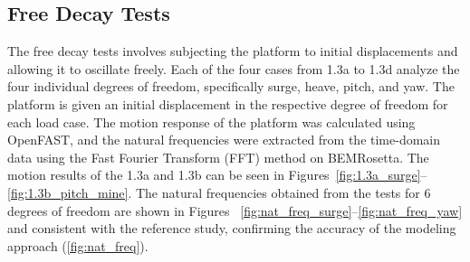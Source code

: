 \documentclass[a4paper, 11pt]{article}
\begin{document}
\subsection{Free Decay Tests}
\hspace*{0.5cm}The free decay tests involves subjecting the platform to initial displacements and allowing it to oscillate freely. Each of the four cases from 1.3a to 1.3d analyze the four individual degrees of freedom, specifically surge, heave, pitch, and yaw. The platform is given an initial displacement in the respective degree of freedom for each load case. The motion response of the platform was calculated using OpenFAST, and the natural frequencies were extracted from the time-domain data using the Fast Fourier Transform (FFT) method on BEMRosetta. The motion results of the 1.3a and 1.3b can be seen in Figures~\ref{fig:1.3a_surge}--\ref{fig:1.3b_pitch_mine}. The natural frequencies obtained from the tests for 6 degrees of freedom are shown in Figures ~\ref{fig:nat_freq_surge}--\ref{fig:nat_freq_yaw} and consistent with the reference study, confirming the accuracy of the modeling approach (\autoref{fig:nat_freq}).
\vspace{0.3cm}
\end{document}
